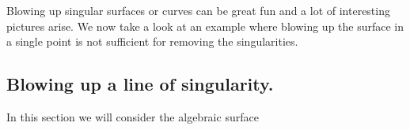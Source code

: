 \documentclass{article}
\begin{document}
    Blowing up singular surfaces or curves can be great fun and a lot of
    interesting pictures arise. We now take a look at an example where blowing
    up the surface in a single point is not sufficient for removing the
    singularities. 
    
    \subsection{Blowing up a line of singularity.}
    \label{sub:blowing_up_a_line_of_singularity_}
    
    In this section we will consider the algebraic surface 
    
    \clearpage
    \printbibliography \printindex
\end{document}

